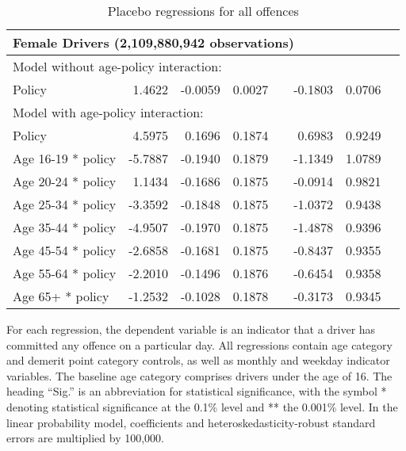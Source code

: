 \begin{table}
\begin{tabular}{l r r r l r r l}
\hline 

\multicolumn{7}{l}{\textbf{Female Drivers} (2,109,880,942  observations)} \\ 

\hline
\multicolumn{7}{l}{Model without age-policy interaction: } \\ 
Policy                   &  1.4622       &  -0.0059        &  0.0027       &            &  -0.1803        &  0.0706       &            \\ 
\hline
\multicolumn{7}{l}{Model with age-policy interaction: } \\ 
Policy                   &  4.5975       &  0.1696        &  0.1874       &            &  0.6983        &  0.9249       &            \\ 
Age 16-19 * policy   &  -5.7887       &  -0.1940        &  0.1879       &            &  -1.1349        &  1.0789       &            \\ 
Age 20-24 * policy   &  1.1434       &  -0.1686        &  0.1875       &            &  -0.0914        &  0.9821       &            \\ 
Age 25-34 * policy   &  -3.3592       &  -0.1848        &  0.1875       &            &  -1.0372        &  0.9438       &            \\ 
Age 35-44 * policy   &  -4.9507       &  -0.1970        &  0.1875       &            &  -1.4878        &  0.9396       &            \\ 
Age 45-54 * policy   &  -2.6858       &  -0.1681        &  0.1875       &            &  -0.8437        &  0.9355       &            \\ 
Age 55-64 * policy   &  -2.2010       &  -0.1496        &  0.1876       &            &  -0.6454        &  0.9358       &            \\ 
Age 65+ * policy   &  -1.2532       &  -0.1028        &  0.1878       &            &  -0.3173        &  0.9345       &            \\ 

\hline 

\end{tabular} 
\caption{Placebo regressions for all offences} 
For each regression, the dependent variable is an indicator that a driver has committed  
any offence on a particular day.  
All regressions contain age category and demerit point category controls, 
as well as monthly and weekday indicator variables. 
The baseline age category comprises drivers under the age of 16. 
The heading ``Sig.'' is an abbreviation for statistical significance, with 
the symbol * denoting statistical significance at the 0.1\% level 
and ** the 0.001\% level. 
In the linear probability model, coefficients and heteroskedasticity-robust standard errors are  
multiplied by 100,000.  
\label{tab:seas_Logit_vs_LPMx100K_placebo_regs} 
\end{table} 
 
